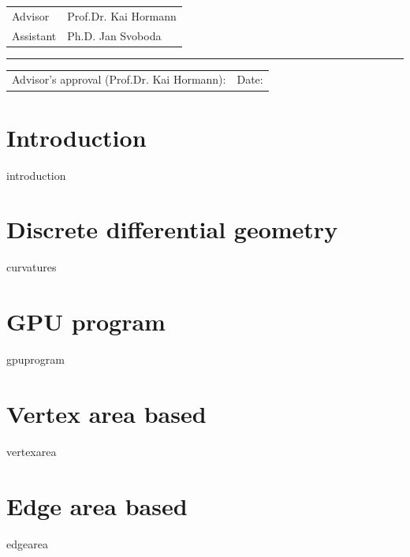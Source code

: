 \documentclass[12pt]{article}
\theoremstyle{definition}
\theoremstyle{definition}
\theoremstyle{plain}
\theoremstyle{plain}
\theoremstyle{plain}
\theoremstyle{plain}
\theoremstyle{definition}
\theoremstyle{remark}
\theoremstyle{remark}
\theoremstyle{remark}
\theoremstyle{remark}
\newcommand{\ADVISOR}{Prof.Dr. Kai Hormann}
\newcommand{\ASSISTANT}{Ph.D. Jan Svoboda}
\begin{document}
\begin{small}
  \begin{tabular}{@{}ll@{}}
    Advisor   & \ADVISOR   \\
    Assistant & \ASSISTANT
  \end{tabular}
\end{small}

\vspace{-.1cm}\rule{\textwidth}{0.4pt}

\begin{small}
  \begin{tabular}{@{} p{} l @{}}
    Advisor's approval (\ADVISOR): & Date:
  \end{tabular}
\end{small}



\newpage \tableofcontents

\newpage \section{Introduction}
{introduction}

\section{Discrete differential geometry}
{curvatures}

\newpage \section{GPU program}
{gpuprogram}

\section{Vertex area based}
{vertexarea}

\newpage \section{Edge area based}
{edgearea}

\end{document}
